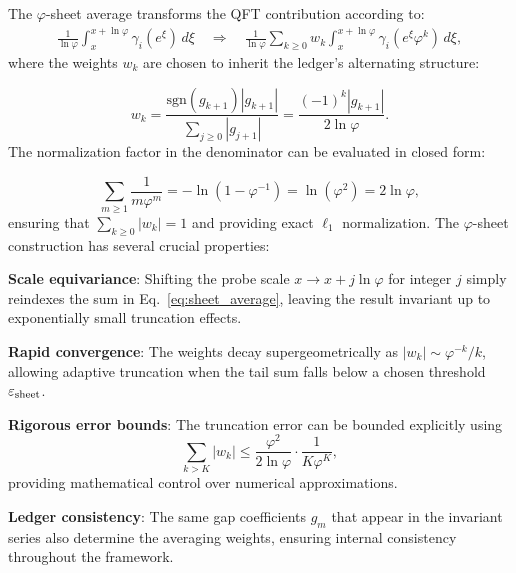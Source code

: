\documentclass[%
amsmath,amssymb,
aps,
prb,
floatfix, showkeys, 10pt,
]{revtex4-2}
\begin{document}
The $\varphi$-sheet average transforms the QFT contribution according to:
\begin{align}
\frac{1}{\ln\varphi}\int_{x}^{x+\ln\varphi} \gamma_i(e^\xi) \, d\xi 
\quad \Rightarrow \quad  \frac{1}{\ln\varphi}
\sum_{k \geq 0} w_k \int_{x}^{x+\ln\varphi} \gamma_i(e^\xi \varphi^k) \, d\xi,
\label{eq:sheet_average}
\end{align}
where the weights $w_k$ are chosen to inherit the ledger's alternating structure:

\begin{equation}
w_k = \frac{\text{sgn}(g_{k+1}) |g_{k+1}|}{\sum_{j \geq 0} |g_{j+1}|} = \frac{(-1)^k |g_{k+1}|}{2\ln\varphi}.
\label{eq:sheet_weights}
\end{equation}
The normalization factor in the denominator can be evaluated in closed form:

\begin{equation}
\sum_{m \geq 1} \frac{1}{m \varphi^m} = -\ln(1-\varphi^{-1}) = \ln(\varphi^2) = 2\ln\varphi,
\label{eq:normalization}
\end{equation}
ensuring that $\sum_{k \geq 0} |w_k| = 1$ and providing exact $\ell_1$ normalization.
The $\varphi$-sheet construction has several crucial properties:

\textbf{Scale equivariance}: Shifting the probe scale $x \to x + j\ln\varphi$ for integer $j$ simply reindexes the sum in Eq.~\eqref{eq:sheet_average}, leaving the result invariant up to exponentially small truncation effects.

\textbf{Rapid convergence}: The weights decay supergeometrically as $|w_k| \sim \varphi^{-k}/k$, allowing adaptive truncation when the tail sum falls below a chosen threshold $\varepsilon_{\rm sheet}$.

\textbf{Rigorous error bounds}: The truncation error can be bounded explicitly using
\begin{equation}
\sum_{k > K} |w_k| \leq \frac{\varphi^2}{2\ln\varphi} \cdot \frac{1}{K \varphi^K},
\label{eq:truncation_bound}
\end{equation}
providing mathematical control over numerical approximations.

\textbf{Ledger consistency}: The same gap coefficients $g_m$ that appear in the invariant series also determine the averaging weights, ensuring internal consistency throughout the framework.
\end{document}
